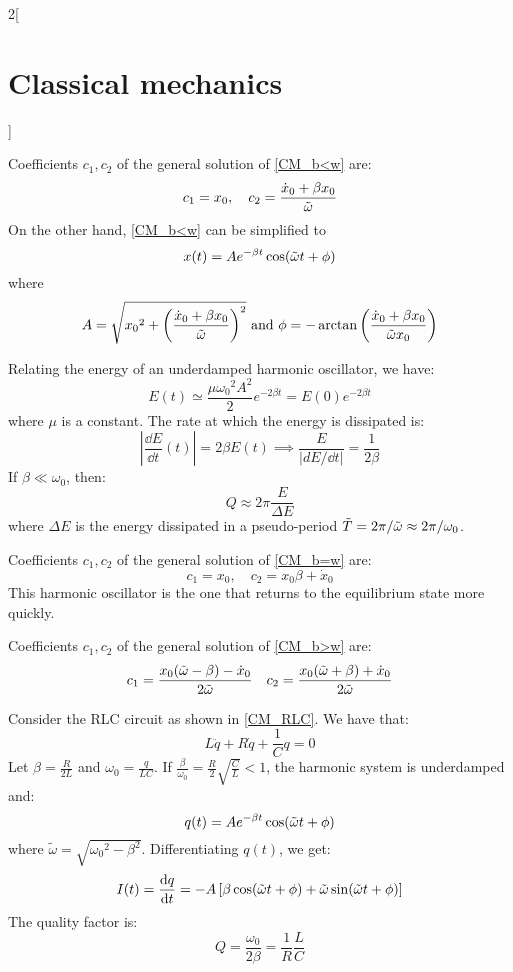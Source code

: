 \documentclass[../../../main.tex]{subfiles}
\begin{document}
\begin{multicols}{2}[\section{Classical mechanics}]
  \begin{proposition}
    Coefficients $c_1,c_2$ of the general solution of \cref{CM_b<w} are: $$c_1=x_0,\quad c_2=\frac{\dot{x}_0+\beta x_0}{\Tilde{\omega}}$$ On the other hand, \cref{CM_b<w} can be simplified to $$x(t)=Ae^{-\beta t}\cos(\Tilde{\omega}t+\phi)$$ where $$A=\sqrt{{x_0}^2+{\left(\frac{\dot{x}_0+\beta x_0}{\Tilde{\omega}}\right)}^2}\text{ and }\phi=-\arctan\left(\frac{\dot{x}_0+\beta x_0}{\Tilde{\omega}x_0}\right)$$
  \end{proposition}
  \begin{proposition}
    Relating the energy of an underdamped harmonic oscillator, we have:
    $$E(t)\simeq\frac{\mu{\omega_0}^2A^2}{2}e^{-2\beta t}=E(0)e^{-2\beta t}$$ where $\mu$ is a constant. The rate at which the energy is dissipated is: $$\left|\frac{\dd{E}}{\dd{t}}(t)\right|=2\beta E(t)\implies\frac{E}{\left|dE/\dd{t}\right|}=\frac{1}{2\beta}$$
    If $\beta\ll\omega_0$, then: $$Q\approx 2\pi\frac{E}{\Delta E}$$ where $\Delta E$ is the energy dissipated in a pseudo-period $\Tilde{T}=2\pi/\Tilde{\omega}\approx2\pi/\omega_0$.
  \end{proposition}
  \begin{proposition}[Critically damped harmonic oscillator: $\beta=\omega_0$]
    Coefficients $c_1,c_2$ of the general solution of \cref{CM_b=w} are: $$c_1=x_0,\quad c_2=x_0\beta+\dot{x}_0$$ This harmonic oscillator is the one that returns to the equilibrium state more quickly.
  \end{proposition}
  \begin{proposition}
    Coefficients $c_1,c_2$ of the general solution of \cref{CM_b>w} are: $$c_1=\frac{x_0(\Tilde{\omega}-\beta)-\dot{x}_0}{2\Tilde{\omega}}\quad c_2=\frac{x_0(\Tilde{\omega}+\beta)+\dot{x}_0}{2\Tilde{\omega}}$$
  \end{proposition}
  \begin{proposition}
    Consider the RLC circuit as shown in \cref{CM_RLC}. We have that:
    $$L\ddot{q}+R\dot{q}+\frac{1}{C}q=0$$ Let $\beta=\frac{R}{2L}$ and $\omega_0=\frac{q}{LC}$. If $\frac{\beta}{\omega_0}=\frac{R}{2}\sqrt{\frac{C}{L}}<1$, the harmonic system is underdamped and: $$q(t)=Ae^{-\beta t}\cos(\Tilde{\omega}t+\phi)$$ where $\tilde{\omega}=\sqrt{{\omega_0}^2-\beta^2}$. Differentiating $q(t)$, we get: $$I(t)=\dv{q}{t}(t)=-A\left[\beta\cos(\Tilde{\omega}t+\phi)+\Tilde{\omega}\sin(\Tilde{\omega}t+\phi)\right]$$ The quality factor is: $$Q=\frac{\omega_0}{2\beta}=\frac{1}{R}\frac{L}{C}$$
    \begin{center}
      \begin{minipage}{\linewidth}
        \centering
        
        \label{CM_RLC}
      \end{minipage}
    \end{center}
  \end{proposition}

\end{multicols}
\end{document}
